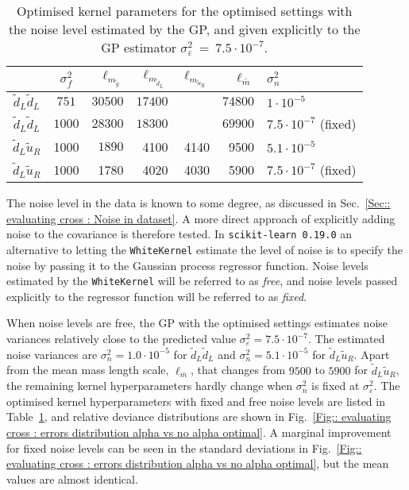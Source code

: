 \documentclass[twoside,english]{uiofysmaster}
\begin{document}
{{\begin{table}
\centering
\begin{tabular}{@{}ccrrrrl@{}} \toprule
& $\sigma_f^2$ & $\ell_{m_{\widetilde{g}}}$ & $\ell_{m_{\widetilde{d}_L}}$ &$\ell_{m_{\widetilde{u}_R}}$ & $\ell_{\bar{m}}$ & $\sigma_n^2$\\
\midrule
$\widetilde{d}_L \widetilde{d}_L$ & $751$ & $30500$ & $17400$ && $74800$ & $1 \cdot 10^{-5}$\\
$\widetilde{d}_L \widetilde{d}_L$ & $1000$ &  $28300$ & $18300$ && $69900$ & $7.5 \cdot 10^{-7}$ (fixed)\\
$\widetilde{d}_L \widetilde{u}_R$ & 1000 & $1890$  & 4100 & 4140 & 9500 & $5.1 \cdot 10^{-5}$\\
$\widetilde{d}_L \widetilde{u}_R$ & 1000& 1780&4020 &4030&5900 & $7.5 \cdot 10^{-7}$ (fixed)\\ \bottomrule
\end{tabular}
\caption{Optimised kernel parameters for the optimised settings with the noise level estimated by the GP, and given explicitly to the GP estimator $\sigma_{\varepsilon}^2~=~7.5 \cdot 10^{-7}$.}
\label{Tab:: evaluating cross : optimal kernel parameters alpha}
\end{table}

The noise level in the data is known to some degree, as discussed in Sec.~\ref{Sec:: evaluating cross : Noise in dataset}. A more direct approach of explicitly adding noise to the covariance is therefore tested. In \verb|scikit-learn 0.19.0| an alternative to letting the \verb|WhiteKernel| estimate the level of noise is to specify the noise by passing it to the Gaussian process regressor function. Noise levels estimated by the \verb|WhiteKernel| will be referred to as \textit{free}, and noise levels passed explicitly to the regressor function will be referred to as \textit{fixed}.

When noise levels are free, the GP with the optimised settings estimates noise variances relatively close to the predicted value $\sigma_{\varepsilon}^2 = 7.5 \cdot 10^{-7}$. The estimated noise variances are $\sigma_n^2=1.0 \cdot 10^{-5}$ for $\widetilde{d}_L \widetilde{d}_L$ and $\sigma_n^2= 5.1 \cdot 10^{-5}$ for $\widetilde{d}_L \widetilde{u}_R$. Apart from the mean mass length scale, $\ell_{\bar{m}}$, that changes from $9500$ to $5900$ for $\widetilde{d}_L \widetilde{u}_R$, the remaining kernel hyperparameters hardly change when $\sigma_n^2$ is fixed at $\sigma_{\varepsilon}^2$. The optimised kernel hyperparameters with fixed and free noise levels are listed in Table~\ref{Tab:: evaluating cross : optimal kernel parameters alpha}, and relative deviance distributions are shown in Fig.~\ref{Fig:: evaluating cross : errors distribution alpha vs no alpha optimal}. A marginal improvement for fixed noise levels can be seen in the standard deviations in Fig.~\ref{Fig:: evaluating cross : errors distribution alpha vs no alpha optimal}, but the mean values are almost identical.

}}
\end{document}

